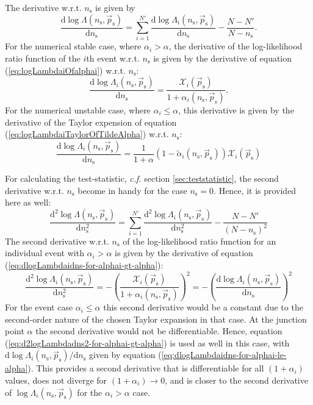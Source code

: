 \documentclass{article}
\newcommand{\ns}{n_{\mathrm{s}}}
\newcommand{\ps}{\vec{p}_{\mathrm{s}}}
\begin{document}
The derivative w.r.t. $\ns$ is given by
\begin{equation}
\frac{\mathrm{d} \log \Lambda(\ns,\ps)}{\mathrm{d} \ns} = \sum_{i=1}^{N'} \frac{\mathrm{d} \log \Lambda_i(\ns,\ps)}{\mathrm{d} \ns} - \frac{N - N'}{N - \ns}.
\end{equation}
For the numerical stable case, where $\alpha_i > \alpha$, the derivative of the
log-likelihood ratio function of the $i$th event w.r.t. $\ns$ is given by the
derivative of equation (\ref{eq:logLambdaiOfalphai}) w.r.t. $\ns$:
\begin{equation}
 \frac{\mathrm{d} \log \Lambda_i(\ns,\ps)}{\mathrm{d} \ns} = \frac{\mathcal{X}_i(\ps)}{1+\alpha_i(\ns,\ps)}.
 \label{eq:dlogLambdaidns-for-alphai-gt-alpha}
\end{equation}
For the numerical unstable case, where $\alpha_i \leq \alpha$, this derivative is
given by the derivative of the Taylor expension of equation (\ref{eq:logLambdaiTaylorOfTildeAlpha})
w.r.t. $\ns$:
\begin{equation}
 \frac{\mathrm{d}\log\Lambda_i(\ns,\ps)}{\mathrm{d} \ns} = \frac{1}{1+\alpha}\left(1 - \tilde{\alpha}_i(\ns,\ps)\right) \mathcal{X}_i(\ps)
 \label{eq:dlogLambdaidns-for-alphai-le-alpha}
\end{equation}

For calculating the test-statistic, \emph{c.f.} section \ref{sec:teststatistic},
the second derivative w.r.t. $\ns$ become in handy for the case $\ns=0$. Hence,
it is provided here as well:
\begin{equation}
 \frac{\mathrm{d}^2\log\Lambda(\ns,\ps)}{\mathrm{d} \ns^2} = \sum_{i=1}^{N'} \frac{\mathrm{d}^2 \log \Lambda_i(\ns,\ps)}{\mathrm{d} \ns^2} - \frac{N-N'}{(N - \ns)^2}
\end{equation}
The second derivative w.r.t. $\ns$ of the log-likelihood ratio function for an
individual event with $\alpha_i > \alpha$ is given by the derivative of equation
(\ref{eq:dlogLambdaidns-for-alphai-gt-alpha}):
\begin{equation}
 \frac{\mathrm{d}^2\log\Lambda_i(\ns,\ps)}{\mathrm{d} \ns^2} = - \left(\frac{\mathcal{X}_i(\ps)}{1+\alpha_i(\ns,\ps)}\right)^2 = - \left( \frac{\mathrm{d} \log \Lambda_i(\ns,\ps)}{\mathrm{d} \ns} \right)^2
 \label{eq:d2logLambdadns2-for-alphai-gt-alpha}
\end{equation}
For the event case $\alpha_i \le \alpha$ this second derivative would be a
constant due to the second-order nature of the chosen Taylor expansion in that
case. At the junction point $\alpha$ the second derivative would not be differentiable.
Hence, equation (\ref{eq:d2logLambdadns2-for-alphai-gt-alpha}) is used as well
in this case, with $\mathrm{d}\log\Lambda_i(\ns,\ps)/\mathrm{d}\ns$ given by
equation (\ref{eq:dlogLambdaidns-for-alphai-le-alpha}). This provides a second
derivative that is differentiable for all $(1 + \alpha_i)$ values, does not
diverge for $(1 + \alpha_i) \rightarrow 0$, and is closer to the second
derivative of $\log\Lambda_i(\ns,\ps)$ for the $\alpha_i > \alpha$ case.
\end{document}
